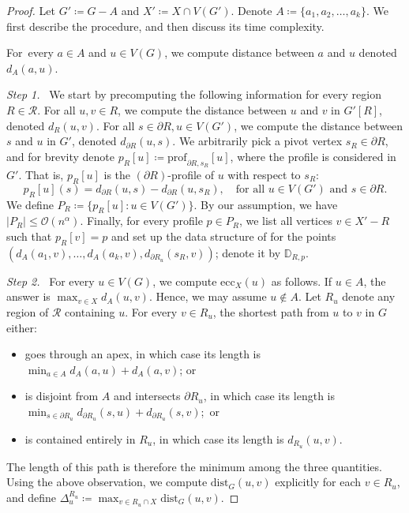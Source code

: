\documentclass[11pt,a4paper]{article}
\newcommand{\Oh}{\mathcal{O}}
\newcommand{\distprofile}[3]{\mathrm{prof}_{#1,#2}[#3]}
\newcommand{\dist}{\mathrm{dist}}
\newcommand{\ecc}{\mathrm{ecc}}
\renewcommand{\leq}{\leqslant}
\renewcommand{\setminus}{-}
\begin{document}
\begin{proof}
    Let $G' \coloneqq G - A$ and $X' \coloneqq X \cap V(G')$.    Denote $A \coloneqq \{a_1,a_2,\ldots,a_k\}$. We first describe the procedure, and then discuss its time complexity.

    For~every $a \in A$ and $u \in V(G)$, we compute distance between $a$ and $u$ denoted $d_A(a, u)$.
    
    \medskip
    \emph{Step 1.} \ 
    We start by precomputing the following information for every region $R\in \mathcal{R}$.
    For all $u, v \in R$, we compute the distance between $u$ and $v$ in $G'[R]$, denoted $d_R(u, v)$.
    For all $s \in \partial R, u \in V(G')$, we compute the distance between $s$ and $u$ in $G'$, denoted $d_{\partial R}(u,s)$.
    We arbitrarily pick a pivot vertex $s_R \in \partial R$, and for brevity denote $p_R[u] \coloneqq \distprofile{\partial R}{s_R}{u}$, where the profile is considered in $G'$. That is, $p_R[u]$ is the $(\partial R)$-profile of $u$ with respect to $s_R$:
    $$p_R[u](s) = d_{\partial R}(u, s) - d_{\partial R}(u, s_R),\quad \textrm{for all }u \in V(G')\textrm{ and } s \in \partial R.$$
    We define $P_R \coloneqq \{ p_R[u] \colon u \in V(G')\}$. By our assumption, we have $|P_R| \leq \Oh(n^\alpha)$. Finally, for every profile $p \in P_R$, we list all vertices $v \in X' \setminus R$ such that $p_R[v] = p$ and set up the data structure of  for the points $(d_A(a_1, v), \dots, d_A(a_k, v), d_{\partial R_u}(s_R, v))$; denote it by $\mathbb{D}_{R, p}$.
    
    \medskip
    \emph{Step 2.} \ 
    For every $u \in V(G)$, we compute $\ecc_X(u)$ as follows. If $u \in A$, the answer is $\max_{v \in X} d_A(u, v)$. Hence, we may assume $u \not\in A$.
    Let $R_u$ denote any region of $\mathcal{R}$ containing $u$. For every $v \in R_u$, the shortest path from $u$ to $v$ in $G$ either:
    \begin{itemize}[nosep]
        \item goes through an apex, in which case its length is $\min_{a \in A} d_A(a, u) + d_A(a, v)$; or
        \item is disjoint from $A$ and intersects $\partial R_u$, in which case its length is $\min_{s \in \partial R_u} d_{\partial R_u}(s, u) + d_{\partial R_u}(s, v)$;~or
        \item is contained entirely in $R_u$, in which case its length is $d_{R_u}(u, v)$.
    \end{itemize}
    The length of this path is therefore the minimum among the three quantities.
    Using the above observation, we compute $\dist_G(u, v)$ explicitly for each $v \in R_u$, and define $\Delta^{R_u}_u \coloneqq \max_{v \in R_u \cap X} \dist_G(u, v)$.
    

\end{proof}
\end{document}
